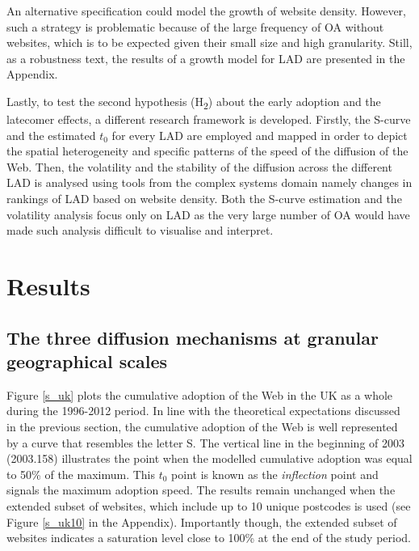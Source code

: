 \documentclass[
  authoryear,
  preprint,
  3p]{elsarticle}
\begin{document}
An alternative specification could model the growth of website density.
However, such a strategy is problematic because of the large frequency
of OA without websites, which is to be expected given their small size
and high granularity. Still, as a robustness text, the results of a
growth model for LAD are presented in the Appendix.

Lastly, to test the second hypothesis (H\textsubscript{2}) about the
early adoption and the latecomer effects, a different research framework
is developed. Firstly, the S-curve and the estimated \(t_0\) for every
LAD are employed and mapped in order to depict the spatial heterogeneity
and specific patterns of the speed of the diffusion of the Web. Then,
the volatility and the stability of the diffusion across the different
LAD is analysed using tools from the complex systems domain
\citep{Batty2009} namely changes in rankings of LAD based on website
density. Both the S-curve estimation and the volatility analysis focus
only on LAD as the very large number of OA would have made such analysis
difficult to visualise and interpret.

\section{Results}\label{sec-results}

\subsection{The three diffusion mechanisms at granular geographical
scales}\label{the-three-diffusion-mechanisms-at-granular-geographical-scales}

Figure \ref{s_uk} plots the cumulative adoption of the Web in the UK as
a whole during the 1996-2012 period. In line with the theoretical
expectations discussed in the previous section, the cumulative adoption
of the Web is well represented by a curve that resembles the letter S.
The vertical line in the beginning of 2003 (2003.158) illustrates the
point when the modelled cumulative adoption was equal to 50\% of the
maximum. This \(t_0\) point is known as the \emph{inflection} point and
signals the maximum adoption speed. The results remain unchanged when
the extended subset of websites, which include up to 10 unique postcodes
is used (see Figure \ref{s_uk10} in the Appendix). Importantly though,
the extended subset of websites indicates a saturation level close to
100\% at the end of the study period.
\end{document}
